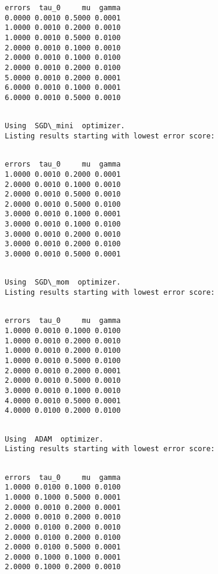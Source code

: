 \documentclass[11pt]{article}
\begin{document}
    
    \begin{verbatim}
errors  tau_0     mu  gamma
0.0000 0.0010 0.5000 0.0001
1.0000 0.0010 0.2000 0.0010
1.0000 0.0010 0.5000 0.0100
2.0000 0.0010 0.1000 0.0010
2.0000 0.0010 0.1000 0.0100
2.0000 0.0010 0.2000 0.0100
5.0000 0.0010 0.2000 0.0001
6.0000 0.0010 0.1000 0.0001
6.0000 0.0010 0.5000 0.0010
    \end{verbatim}

    
    \begin{Verbatim}[commandchars=\\\{\}]

Using  SGD\_mini  optimizer.
Listing results starting with lowest error score: 


    \end{Verbatim}

    
    \begin{verbatim}
errors  tau_0     mu  gamma
1.0000 0.0010 0.2000 0.0001
2.0000 0.0010 0.1000 0.0010
2.0000 0.0010 0.5000 0.0010
2.0000 0.0010 0.5000 0.0100
3.0000 0.0010 0.1000 0.0001
3.0000 0.0010 0.1000 0.0100
3.0000 0.0010 0.2000 0.0010
3.0000 0.0010 0.2000 0.0100
3.0000 0.0010 0.5000 0.0001
    \end{verbatim}

    
    \begin{Verbatim}[commandchars=\\\{\}]

Using  SGD\_mom  optimizer.
Listing results starting with lowest error score: 


    \end{Verbatim}

    
    \begin{verbatim}
errors  tau_0     mu  gamma
1.0000 0.0010 0.1000 0.0100
1.0000 0.0010 0.2000 0.0010
1.0000 0.0010 0.2000 0.0100
1.0000 0.0010 0.5000 0.0100
2.0000 0.0010 0.2000 0.0001
2.0000 0.0010 0.5000 0.0010
3.0000 0.0010 0.1000 0.0010
4.0000 0.0010 0.5000 0.0001
4.0000 0.0100 0.2000 0.0100
    \end{verbatim}

    
    \begin{Verbatim}[commandchars=\\\{\}]

Using  ADAM  optimizer.
Listing results starting with lowest error score: 


    \end{Verbatim}

    
    \begin{verbatim}
errors  tau_0     mu  gamma
1.0000 0.0100 0.1000 0.0100
1.0000 0.1000 0.5000 0.0001
2.0000 0.0010 0.2000 0.0001
2.0000 0.0010 0.2000 0.0010
2.0000 0.0100 0.2000 0.0010
2.0000 0.0100 0.2000 0.0100
2.0000 0.0100 0.5000 0.0001
2.0000 0.1000 0.1000 0.0001
2.0000 0.1000 0.2000 0.0010
    \end{verbatim}
\end{document}
